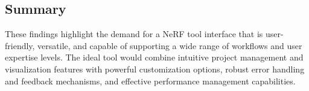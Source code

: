 
\subsection*{Summary}

These findings highlight the demand for a NeRF tool interface that is user-friendly, versatile, and capable of supporting a wide range of workflows and user expertise levels. 
The ideal tool would combine intuitive project management and visualization features with powerful customization options, robust error handling and feedback mechanisms, and effective performance management capabilities.
